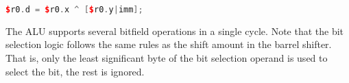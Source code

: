 \begin{lstlisting}[numbers=none, basicstyle=\ttfamily\footnotesize, language=C++]
$r0.d = $r0.x ^ [$r0.y|imm];
\end{lstlisting}

The \rvex{} ALU supports several bitfield operations in a single cycle. Note
that the bit selection logic follows the same rules as the shift amount in the
barrel shifter. That is, only the least significant byte of the bit selection
operand is used to select the bit, the rest is ignored.
\vskip 10pt
\noindent\begin{minipage}{\textwidth}
\label{opc:SBIT}
\noindent\textbf{\footnotesize\texttt{}}

\noindent\textbf{\footnotesize\texttt{}}


\end{minipage}
